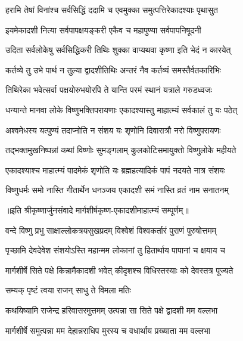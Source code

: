 \twolineshloka
{हरामि तेषां विनांश्च सर्वसिद्धिं ददामि च}
{एवमुक्का समुत्पत्तिरेकादश्याः पृथासुत} %

\twolineshloka
{इयमेकादशी नित्या सर्वपापक्षयङ्करी}
{एकैव च महापुण्या सर्वपापनिषूदनी} %

\twolineshloka
{उदिता सर्वलोकेषु सर्वसिद्धिकरी तिथिः}
{शुक्का वाप्यथवा कृष्णा इति भेदं न कारयेत्} %

\twolineshloka
{कर्तव्ये तु उभे पार्थ न तुल्या द्वादशीतिथिः}
{अन्तरं नैव कर्तव्यं समस्तैर्वतकारिभिः} %

\twolineshloka
{तिथिरेका भवेत्सर्वा पक्षयोरुभयोरपि}
{ते यान्ति परमं स्थानं यत्राले गरुडध्वजः} %

\twolineshloka
{धन्यान्ते मानवा लोके विष्णुभक्तिपरायणाः}
{एकादश्यास्तु माहात्म्यं सर्वकालं तु यः पठेत्} %

\twolineshloka
{अश्वमेधस्य यत्पुण्यं तदाप्नोति न संशय}
{यः शृणोनि दिवारात्रौ नरो विष्णुपरायणः} %

\twolineshloka
{तद्भक्तमुखनिष्पन्नां कथां विष्णोः सुमङ्गलाम्}
{कुलकोटिसमायुक्तो विष्णुलोके महीयते} %

\twolineshloka
{एकादश्याश्च माहात्म्यं पादमेकं शृणोति यः}
{ब्रह्महत्यादिकं पापं नदयते नात्र संशयः} %

\twolineshloka
{विष्णुधर्मः समो नास्ति गीतार्थेन धनञ्जय}
{एकादशी समं नास्ति व्रतं नाम सनातनम्} %

॥इति श्रीकृष्णार्जुनसंवादे मार्गशीर्षकृष्ण-एकादशीमाहात्म्यं सम्पूर्णम्॥



\twolineshloka
{वन्दे विष्णु प्रभु साक्षाल्लोकत्रयसुखप्रदम्}
{विश्वेशं विश्वकर्तारं पुराणं पुरुषोत्तमम्} %

\twolineshloka
{पृच्छामि देवदेवेश संशयोऽस्ति महान्मम}
{लोकानां तु हितार्थाय पापानां च क्षयाय च} %

\twolineshloka
{मार्गशीर्षे सिते पक्षे किन्नामैकादशी भवेत्}
{कीदृशश्च विधिस्तस्याः को देवस्तत्र पूज्यते} %



\onelineshloka
{सम्यक् पृष्टं त्वया राजन् साधु ते विमला मतिः} %

\twolineshloka
{कथयिष्यामि राजेन्द्र हरिवासरमुत्तमम्}
{उत्पन्ना सा सिते पक्षे द्वादशी मम वल्लभा} %

\twolineshloka
{मार्गशीर्षे समुत्पन्ना मम देहान्नराधिप}
{मुरस्य च वधार्थाय प्रख्याता मम वल्लभा} %

